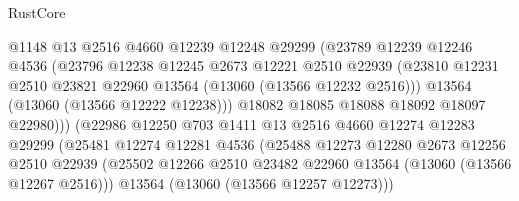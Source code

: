 \begin{lexlean}{RustCore}
\begin{coremodule}
                                @1148
                                @13
                                @2516
                                @4660
                                @12239
                                @12248
                                @29299
                                (@23789
                                  @12239
                                  @12246
                                  @4536
                                  (@23796
                                    @12238
                                    @12245
                                    @2673
                                    @12221
                                    @2510
                                    @22939
                                    (@23810
                                      @12231
                                      @2510
                                      @23821
                                      @22960
                                      @13564
                                      (@13060 (@13566 @12232 @2516)))
                                    @13564
                                    (@13060 (@13566 @12222 @12238)))
                                  @18082
                                  @18085
                                  @18088
                                  @18092
                                  @18097
                                  @22980)))
                            (@22986
                              @12250
                              @703
                              @1411
                              @13
                              @2516
                              @4660
                              @12274
                              @12283
                              @29299
                              (@25481
                                @12274
                                @12281
                                @4536
                                (@25488
                                  @12273
                                  @12280
                                  @2673
                                  @12256
                                  @2510
                                  @22939
                                  (@25502
                                    @12266
                                    @2510
                                    @23482
                                    @22960
                                    @13564
                                    (@13060 (@13566 @12267 @2516)))
                                  @13564
                                  (@13060 (@13566 @12257 @12273)))

\end{coremodule}
\end{lexlean}
